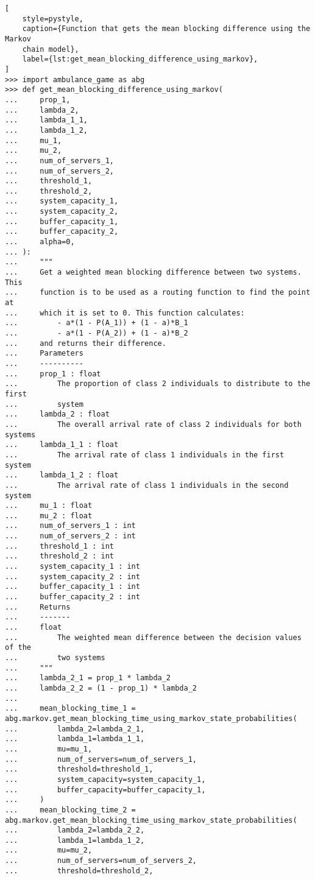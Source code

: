 \begin{lstlisting}[
    style=pystyle,
    caption={Function that gets the mean blocking difference using the Markov
    chain model},
    label={lst:get_mean_blocking_difference_using_markov},
]
>>> import ambulance_game as abg
>>> def get_mean_blocking_difference_using_markov(
...     prop_1,
...     lambda_2,
...     lambda_1_1,
...     lambda_1_2,
...     mu_1,
...     mu_2,
...     num_of_servers_1,
...     num_of_servers_2,
...     threshold_1,
...     threshold_2,
...     system_capacity_1,
...     system_capacity_2,
...     buffer_capacity_1,
...     buffer_capacity_2,
...     alpha=0,
... ):
...     """
...     Get a weighted mean blocking difference between two systems. This
...     function is to be used as a routing function to find the point at
...     which it is set to 0. This function calculates:
...         - a*(1 - P(A_1)) + (1 - a)*B_1
...         - a*(1 - P(A_2)) + (1 - a)*B_2
...     and returns their difference.
...     Parameters
...     ----------
...     prop_1 : float
...         The proportion of class 2 individuals to distribute to the first
...         system
...     lambda_2 : float
...         The overall arrival rate of class 2 individuals for both systems
...     lambda_1_1 : float
...         The arrival rate of class 1 individuals in the first system
...     lambda_1_2 : float
...         The arrival rate of class 1 individuals in the second system
...     mu_1 : float
...     mu_2 : float
...     num_of_servers_1 : int
...     num_of_servers_2 : int
...     threshold_1 : int
...     threshold_2 : int
...     system_capacity_1 : int
...     system_capacity_2 : int
...     buffer_capacity_1 : int
...     buffer_capacity_2 : int
...     Returns
...     -------
...     float
...         The weighted mean difference between the decision values of the
...         two systems
...     """
...     lambda_2_1 = prop_1 * lambda_2
...     lambda_2_2 = (1 - prop_1) * lambda_2
...
...     mean_blocking_time_1 = abg.markov.get_mean_blocking_time_using_markov_state_probabilities(
...         lambda_2=lambda_2_1,
...         lambda_1=lambda_1_1,
...         mu=mu_1,
...         num_of_servers=num_of_servers_1,
...         threshold=threshold_1,
...         system_capacity=system_capacity_1,
...         buffer_capacity=buffer_capacity_1,
...     )
...     mean_blocking_time_2 = abg.markov.get_mean_blocking_time_using_markov_state_probabilities(
...         lambda_2=lambda_2_2,
...         lambda_1=lambda_1_2,
...         mu=mu_2,
...         num_of_servers=num_of_servers_2,
...         threshold=threshold_2,

\end{lstlisting}
